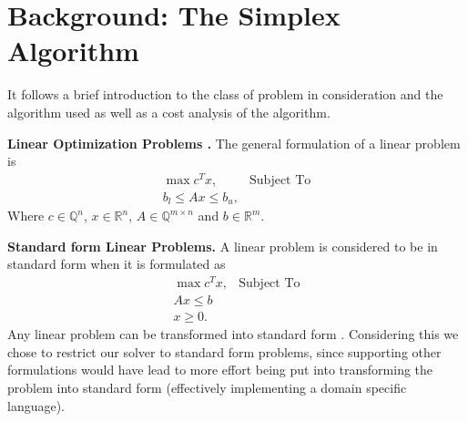 \documentclass[letterpaper]{article}
\newcommand{\rtodo}[1]{\todo[inline, color=yellow]{#1}}
\newcommand{\mypar}[1]{{\bf #1.}}
\begin{document}

\section{Background: The Simplex Algorithm}\label{sec:background}
It follows a brief introduction to the class of problem in consideration
and the algorithm used as well as a cost analysis of the algorithm.

\mypar{Linear Optimization Problems \cite{dantzig}}
The general formulation of a linear problem is
\begin{eqnarray*}
    \max c^T x, & \text{Subject To}\\
    b_l \leq A x \leq b_u,
\end{eqnarray*}
Where $c \in \mathbb{Q}^n$, $x \in \mathbb{R}^n$, $A \in \mathbb{Q}^{m \times n}$ and $b \in \mathbb{R}^m$.

\mypar{Standard form Linear Problems}
A linear problem is considered to be in standard form when it is formulated as
\begin{eqnarray*}
    \max c^T x, & \text{Subject To}\\
    A x \leq b \\
    x \geq 0.
\end{eqnarray*}
Any linear problem can be transformed into standard form \rtodo{citation needed?}. Considering this we chose to restrict our solver to standard form problems, since supporting other formulations would have lead to more effort being put into transforming the problem into standard form (effectively implementing a domain specific language).
\end{document}
